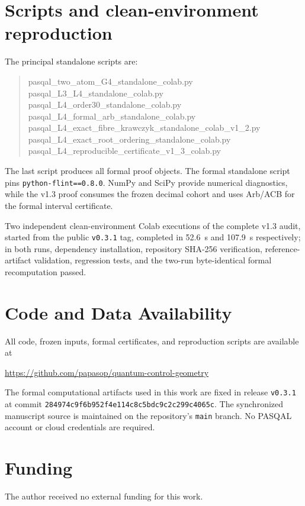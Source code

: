 \documentclass[11pt]{article}
\begin{document}
\section{Scripts and clean-environment reproduction}
\label{app:repro}

The principal standalone scripts are:
\begin{quote}
\small\ttfamily
pasqal\_two\_atom\_G4\_standalone\_colab.py\\
pasqal\_L3\_L4\_standalone\_colab.py\\
pasqal\_L4\_order30\_standalone\_colab.py\\
pasqal\_L4\_formal\_arb\_standalone\_colab.py\\
pasqal\_L4\_exact\_fibre\_krawczyk\_standalone\_colab\_v1\_2.py\\
pasqal\_L4\_exact\_root\_ordering\_standalone\_colab.py\\
pasqal\_L4\_reproducible\_certificate\_v1\_3\_colab.py
\end{quote}
The last script produces all formal proof objects. The formal standalone
script pins \texttt{python-flint==0.8.0}. NumPy and SciPy provide numerical
diagnostics, while the v1.3 proof consumes the frozen decimal cohort and
uses Arb/ACB for the formal interval certificate.

Two independent clean-environment Colab executions of the complete v1.3
audit, started from the public \texttt{v0.3.1} tag, completed in 52.6~s and
107.9~s respectively; in both runs, dependency installation, repository
SHA-256 verification, reference-artifact validation, regression tests, and
the two-run byte-identical formal recomputation passed.

\section*{Code and Data Availability}

All code, frozen inputs, formal certificates, and reproduction scripts
are available at
\begin{center}
\url{https://github.com/papasop/quantum-control-geometry}
\end{center}
The formal computational artifacts used in this work are fixed in
release \texttt{v0.3.1} at commit
\texttt{284974c9f6b952f4e114c8c5bdc9c2c299c4065c}.
The synchronized manuscript source is maintained on the repository's
\texttt{main} branch.
No PASQAL account or cloud credentials are required.

\section*{Funding}
The author received no external funding for this work.
\end{document}
